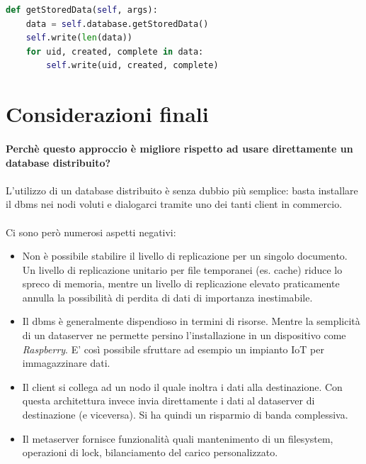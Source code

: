 \documentclass[11pt,a4paper,english]{article}
\begin{document}
\begin{lstlisting}[language=Python, title=Dataserver]
def getStoredData(self, args):
    data = self.database.getStoredData()
    self.write(len(data))
    for uid, created, complete in data:
        self.write(uid, created, complete)
\end{lstlisting}


\section{Considerazioni finali}

\paragraph{Perchè questo approccio è migliore rispetto ad usare direttamente un database distribuito?} 

\paragraph{} L'utilizzo di un database distribuito è senza dubbio più semplice: basta installare il dbms nei nodi voluti e dialogarci tramite uno dei tanti client in commercio. 

\paragraph{} Ci sono però numerosi aspetti negativi: \begin{itemize}
	\item Non è possibile stabilire il livello di replicazione per un singolo documento. Un livello di replicazione unitario per file temporanei (es. cache) riduce lo spreco di memoria, mentre un livello di replicazione elevato praticamente annulla la possibilità di perdita di dati di importanza inestimabile.
	\item Il dbms è generalmente dispendioso in termini di risorse. Mentre la semplicità di un dataserver ne permette persino l'installazione in un dispositivo come \emph{Raspberry}. E' così possibile sfruttare ad esempio un impianto IoT per immagazzinare dati. 
	\item Il client si collega ad un nodo il quale inoltra i dati alla destinazione. Con questa architettura invece invia direttamente i dati al dataserver di destinazione (e viceversa). Si ha quindi un risparmio di banda complessiva.  
	\item Il metaserver fornisce funzionalità quali mantenimento di un filesystem, operazioni di lock, bilanciamento del carico personalizzato. 
\end{itemize}
\end{document}
